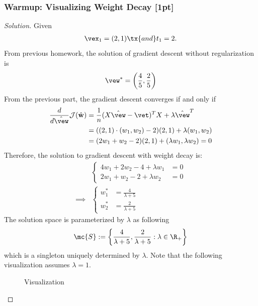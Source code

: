 \documentclass{article}
\begin{document}
	\subsubsection{Warmup: Visualizing Weight Decay [1pt]}
	\begin{proof}[Solution]
		Given 
		\begin{align}
			\vex_1 = (2, 1)\tx{ and } t_1 = 2.
		\end{align}
		From previous homework, the solution of gradient descent without regularization is
		\begin{align}
			\vew^* = \left(\frac{4}{5}, \frac{2}{5} \right)
		\end{align}
		From the previous part, the gradient descent converges if and only if
		\begin{align}
			\frac{d}{d\hat{\vew}} \mathcal{J}(\hat{\mathbf{w}})
			&= \frac{1}{n} (X \hat{\vew} - \vet)^T X + \lambda \hat{\vew}^T \\
			&= ((2,1)\cdot (w_1, w_2) - 2) (2, 1) + \lambda (w_1, w_2) \\
			&= (2 w_1 + w_2 - 2) (2, 1) + (\lambda w_1, \lambda w_2) = 0 \\
		\end{align}
		Therefore, the solution to gradient descent with weight decay is:
		\begin{align}
			&\begin{cases}
				4 w_1 + 2 w_2 -4 + \lambda w_1 &= 0 \\
				2 w_1 + w_2 - 2 + \lambda w_2 &= 0
			\end{cases} \\
			\implies &\begin{cases}
				w_1^* &= \frac{4}{\lambda +5} \\
				w_2^* &= \frac{2}{\lambda +5}
			\end{cases}
		\end{align}
		The solution space is parameterized by $\lambda$ as following
		\begin{align}
			\mc{S} := \left \{
			\frac{4}{\lambda +5}, \frac{2}{\lambda +5}: \lambda \in \R_+
			\right \}
		\end{align}
		which is a singleton uniquely determined by $\lambda$. Note that the following visualization assumes $\lambda = 1$.
		\begin{figure}[H]
			\centering
			\small
			\caption{Visualization}

\end{figure}
\end{proof}
\end{document}
